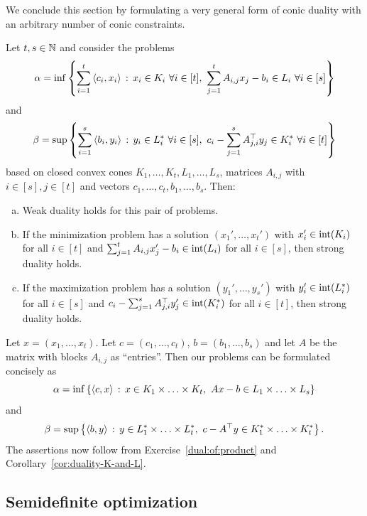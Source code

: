 We conclude this section by formulating a very general form of conic duality with an arbitrary number of conic constraints. 

\begin{exercise}
Let $t, s \in \mathbb{N}$ and consider the problems
	\[
		\alpha  = \inf \left\{ \sum_{i=1}^t \left\langle c_i , x_i \right\rangle  \,:\, x_i \in K_i \ \forall i \in [t], \ \sum_{j=1}^t A_{i,j} x_j - b_i \in L_i \ \forall i \in [s] \right\}
	\]
	and
	\[
		\beta = \sup \setcond{ \sum_{i=1}^s \sprod{b_i}{y_i} }{y_i \in L_i^\ast \ \forall i \in [s], \ c_i - \sum_{j=1}^s A_{j,i}^\top y_j  \in K_i^\ast \ \forall i \in [t]}
	\]
	based on closed convex cones $K_1,\ldots,K_t, L_1,\ldots,L_s$, matrices $A_{i,j}$ with $i \in [s], j \in [t]$ and vectors $c_1,\ldots,c_t,b_1,\ldots,b_s$. Then: 
	\begin{enumerate}[(a)]
		\item Weak duality holds for this pair of problems.
		\item If the minimization problem has a solution $(x_1',\ldots,x_t')$ with $x_i' \in \operatorname{int}(K_i)$ for all $i \in [t]$ and $\sum_{j=1}^t A_{i,j} x_j' - b_i \in \operatorname{int}(L_i)$ for all $i \in [s]$, then strong duality holds.
		\item If the maximization problem has a solution $(y_1',\ldots,y_s')$ with $y_i' \in \operatorname{int}(L_i^\ast)$ for all $i \in [s]$ and $c_i - \sum_{j=1}^s A_{j,i}^\top y_j' \in \operatorname{int}(K_i^\ast)$ for all $i \in [t]$, then strong duality holds.
	\end{enumerate}
\end{exercise}
\begin{solution}
	Let $x=(x_1,\ldots,x_t)$. Let $c=(c_1,\ldots,c_t)$, $b=(b_1,\ldots,b_s)$ and let $A$ be the matrix with blocks $A_{i,j}$ as ``entries''. Then our problems can be formulated concisely as
	\[
		\alpha = \inf \left\{ \left\langle c , x \right\rangle \,:\, x \in K_1 \times \ldots \times K_t,  \ A x - b \in L_1 \times \ldots \times L_s  \right\}
	\]
	and
	\[
		\beta = \sup \setcond{\sprod{b}{y}}{y \in L_1^\ast \times \ldots \times L_t^\ast, \ c- A^\top y \in K_1^\ast \times \ldots \times K_t^\ast}.
	\]
	The assertions now follow from Exercise~\ref{dual:of:product} and Corollary~\ref{cor:duality-K-and-L}.
\end{solution}


\subsection{Semidefinite optimization}

